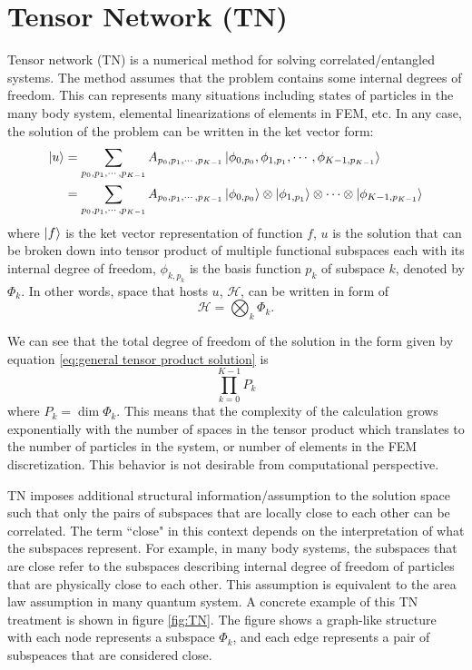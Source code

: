 \documentclass[preprint, 12pt]{revtex4-2}
\numberwithin{equation}{section}
\begin{document}
\section{Tensor Network (TN)}
Tensor network (TN) is a numerical method for solving correlated/entangled systems. The method assumes that the problem contains some internal degrees of freedom. This can represents many situations including states of particles in the many body system, elemental linearizations of elements in FEM, etc. In any case, the solution of the problem can be written in the ket vector form:
\begin{equation}\label{eq:general tensor product solution}
    \begin{aligned}
        \ket{u} &= \sum_{p_0,p_1,\cdots,p_{K-1}}A_{p_0,p_1,\cdots,p_{K-1}}\ket{\phi_{0, p_0}, \phi_{1,p_1}, \cdots, \phi_{K-1,p_{K-1}}} \\
        &= \sum_{p_0,p_1,\cdots,p_{K-1}}A_{p_0,p_1,\cdots,p_{K-1}}\ket{\phi_{0, p_0}}\otimes \ket{\phi_{1,p_1}}\otimes \cdots\otimes \ket{\phi_{{K-1},p_{K-1}}}
    \end{aligned}
\end{equation}
where $\ket{f}$ is the ket vector representation of function $f$, $u$ is the solution that can be broken down into tensor product of multiple functional subspaces each with its internal degree of freedom, $\phi_{k,p_k}$ is the basis function $p_k$ of subspace $k$, denoted by $\Phi_k$. In other words, space that hosts $u$, $\mathcal{H}$, can be written in form of
\begin{equation}\label{eq:tensor product space}
    \mathcal{H} = \bigotimes_k \Phi_k.
\end{equation}

We can see that the total degree of freedom of the solution in the form given by equation \ref{eq:general tensor product solution} is
\begin{equation}
    \prod_{k=0}^{K-1} P_k
\end{equation}
where $P_k=\dim \Phi_k$. This means that the complexity of the calculation grows exponentially with the number of spaces in the tensor product which translates to the number of particles in the system, or number of elements in the FEM discretization. This behavior is not desirable from computational perspective. 

TN imposes additional structural information/assumption to the solution space such that only the pairs of subspaces that are locally close to each other can be correlated. The term ``close" in this context depends on the interpretation of what the subspaces represent. For example, in many body systems, the subspaces that are close refer to the subspaces describing internal degree of freedom of particles that are physically close to each other. This assumption is equivalent to the area law assumption in many quantum system. A concrete example of this TN treatment is shown in figure \ref{fig:TN}. The figure shows a graph-like structure with each node represents a subspace $\Phi_k$, and each edge represents a pair of subspeaces that are considered close.
\end{document}
